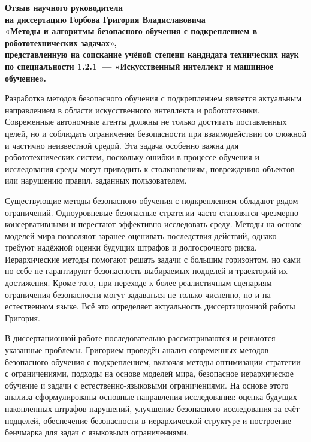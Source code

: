 \documentclass[a4paper,14pt]{extarticle}
\begin{document}
\begin{center}
\textbf{%
Отзыв научного руководителя\\[0.5\baselineskip]
на диссертацию Горбова Григория Владиславовича\\[0.5\baselineskip]
«Методы и алгоритмы безопасного обучения с подкреплением в робототехнических задачах»,\\[0.5\baselineskip]
представленную на соискание учёной степени кандидата технических наук\\
по специальности 1.2.1~--- «Искусственный интеллект и машинное обучение».%
}
\end{center}

Разработка методов безопасного обучения с подкреплением является актуальным направлением в области искусственного интеллекта и робототехники. Современные автономные агенты должны не только достигать поставленных целей, но и соблюдать ограничения безопасности при взаимодействии со сложной и частично неизвестной средой. Эта задача особенно важна для робототехнических систем, поскольку ошибки в процессе обучения и исследования среды могут приводить к столкновениям, повреждению объектов или нарушению правил, заданных пользователем.

Существующие методы безопасного обучения с подкреплением обладают рядом ограничений. Одноуровневые безопасные стратегии часто становятся чрезмерно консервативными и перестают эффективно исследовать среду. Методы на основе моделей мира позволяют заранее оценивать последствия действий, однако требуют надёжной оценки будущих штрафов и долгосрочного риска. Иерархические методы помогают решать задачи с большим горизонтом, но сами по себе не гарантируют безопасность выбираемых подцелей и траекторий их достижения. Кроме того, при переходе к более реалистичным сценариям ограничения безопасности могут задаваться не только численно, но и на естественном языке. Всё это определяет актуальность диссертационной работы Григория.

В диссертационной работе последовательно рассматриваются и решаются указанные проблемы. Григорием проведён анализ современных методов безопасного обучения с подкреплением, включая методы оптимизации стратегии с ограничениями, подходы на основе моделей мира, безопасное иерархическое обучение и задачи с естественно-языковыми ограничениями. На основе этого анализа сформулированы основные направления исследования: оценка будущих накопленных штрафов нарушений, улучшение безопасного исследования за счёт подцелей, обеспечение безопасности в иерархической структуре и построение бенчмарка для задач с языковыми ограничениями.
\end{document}
